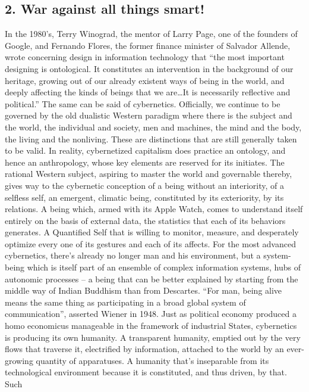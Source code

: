 \documentclass[landscape,twocolumn,letterpaper]{article}
\begin{document}
\subsection*{2. War against all things smart!}


In the 1980’s, Terry Winograd, the mentor of Larry Page, one of the
founders of Google, and Fernando Flores, the former finance minister
of Salvador Allende, wrote concerning design in information technology
that “the most important designing is ontological. It constitutes an
intervention in the background of our heritage, growing out of our
already existent ways of being in the world, and deeply affecting the
kinds of beings that we are…It is necessarily reflective and
political.” The same can be said of cybernetics. Officially, we
continue to be governed by the old dualistic Western paradigm where
there is the subject and the world, the individual and society, men
and machines, the mind and the body, the living and the
nonliving. These are distinctions that are still generally taken to be
valid. In reality, cybernetized capitalism does practice an ontology,
and hence an anthropology, whose key elements are reserved for its
initiates. The rational Western subject, aspiring to master the world
and governable thereby, gives way to the cybernetic conception of a
being without an interiority, of a selfless self, an emergent,
climatic being, constituted by its exteriority, by its relations. A
being which, armed with its Apple Watch, comes to understand itself
entirely on the basis of external data, the statistics that each of
its behaviors generates. A Quantified Self that is willing to monitor,
measure, and desperately optimize every one of its gestures and each
of its affects. For the most advanced cybernetics, there’s already no
longer man and his environment, but a system-being which is itself
part of an ensemble of complex information systems, hubs of autonomic
processes – a being that can be better explained by starting from the
middle way of Indian Buddhism than from Descartes. “For man, being
alive means the same thing as participating in a broad global system
of communication”, asserted Wiener in 1948. Just as political economy
produced a homo economicus manageable in the framework of industrial
States, cybernetics is producing its own humanity. A transparent
humanity, emptied out by the very flows that traverse it, electrified
by information, attached to the world by an ever-growing quantity of
apparatuses. A humanity that’s inseparable from its technological
environment because it is constituted, and thus driven, by that. Such
\end{document}
